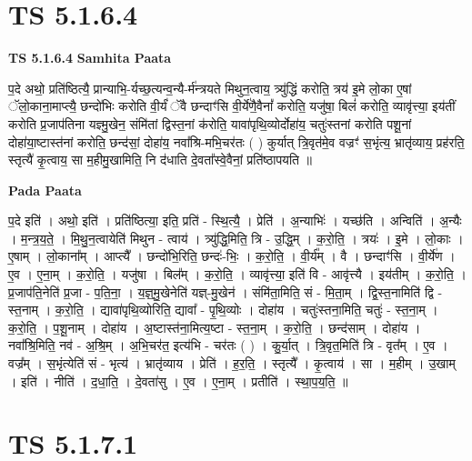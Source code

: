 \documentclass[17pt]{extarticle}
\begin{document}
\section*{ TS 5.1.6.4 }

\textbf{TS 5.1.6.4 } \newline
\textbf{Samhita Paata} \newline

प॒दे अथो॒ प्रति॑ष्ठित्यै॒ प्रान्याभि॒-र्यच्छ॒त्यन्व॒न्यै-र्म॑न्त्रयते मिथुन॒त्वाय॒ त्र्यु॑द्धिं करोति॒ त्रय॑ इ॒मे लो॒का ए॒षां ॅलो॒काना॒माप्त्यै॒ छन्दो॑भिः करोति वी॒र्यं॑ ॅवै छन्दाꣳ॑सि वी॒र्ये॑णै॒वैनां᳚ करोति॒ यजु॑षा॒ बिलं॑ करोति॒ व्यावृ॑त्त्या॒ इय॑तीं करोति प्र॒जाप॑तिना यज्ञ्मु॒खेन॒ संमि॑तां द्विस्त॒नां क॑रोति॒ यावा॑पृथि॒व्योर्दोहा॑य॒ चतुः॑स्तनां करोति पशू॒नां दोहा॑या॒ष्टास्त॑नां करोति॒ छन्द॑सां॒ दोहा॑य॒ नवा᳚श्रि-मभि॒चर॑तः ( ) कुर्यात् त्रि॒वृत॑मे॒व वज्रꣳ॑ स॒भृंत्य॒ भ्रातृ॑व्याय॒ प्रह॑रति॒ स्तृत्यै॑ कृ॒त्वाय॒ सा म॒हीमु॒खामिति॒ नि द॑धाति दे॒वता᳚स्वे॒वैनां॒ प्रति॑ष्ठापयति ॥ \newline

\textbf{Pada Paata} \newline

प॒दे इति॑ । अथो॒ इति॑ । प्रति॑ष्ठित्या॒ इति॒ प्रति॑ - स्थि॒त्यै॒ । प्रेति॑ । अ॒न्याभिः॑ । यच्छ॑ति । अन्विति॑ । अ॒न्यैः । म॒न्त्र॒य॒ते॒ । मि॒थु॒न॒त्वायेति॑ मिथुन - त्वाय॑ । त्र्यु॑द्धि॒मिति॒ त्रि - उ॒द्धि॒म् । क॒रो॒ति॒ । त्रयः॑ । इ॒मे । लो॒काः । ए॒षाम् । लो॒काना᳚म् । आप्त्यै᳚ । छन्दो॑भि॒रिति॒ छन्दः॑-भिः॒ । क॒रो॒ति॒ । वी॒र्य᳚म् । वै । छन्दाꣳ॑सि । वी॒र्ये॑ण । ए॒व । ए॒ना॒म् । क॒रो॒ति॒ । यजु॑षा । बिल᳚म् । क॒रो॒ति॒ । व्यावृ॑त्त्या॒ इति॑ वि - आवृ॑त्त्यै । इय॑तीम् । क॒रो॒ति॒ । प्र॒जाप॑ति॒नेति॑ प्र॒जा - प॒ति॒ना॒ । य॒ज्ञ्॒मु॒खेनेति॑ यज्ञ्-मु॒खेन॑ । संमि॑ता॒मिति॒ सं - मि॒ता॒म् । द्वि॒स्त॒नामिति॑ द्वि - स्त॒नाम् । क॒रो॒ति॒ । द्यावा॑पृथि॒व्योरिति॒ द्यावा᳚ - पृ॒थि॒व्योः । दोहा॑य । चतुः॑स्तना॒मिति॒ चतुः॑ - स्त॒ना॒म् । क॒रो॒ति॒ । प॒शू॒नाम् । दोहा॑य । अ॒ष्टास्त॑ना॒मित्य॒ष्टा - स्त॒ना॒म् । क॒रो॒ति॒ । छन्द॑साम् । दोहा॑य । नवा᳚श्रि॒मिति॒ नव॑ - अ॒श्रि॒म् । अ॒भि॒चर॑त॒ इत्य॑भि - चर॑तः ( ) । कु॒र्या॒त् । त्रि॒वृत॒मिति॑ त्रि - वृत᳚म् । ए॒व । वज्र᳚म् । स॒भृंत्येति॑ सं - भृत्य॑ । भ्रातृ॑व्याय । प्रेति॑ । ह॒र॒ति॒ । स्तृत्यै᳚ । कृ॒त्वाय॑ । सा । म॒हीम् । उ॒खाम् । इति॑ । नीति॑ । द॒धा॒ति॒ । दे॒वता॑सु । ए॒व । ए॒ना॒म् । प्रतीति॑ । स्था॒प॒य॒ति॒ ॥  \newline




\section*{ TS 5.1.7.1 }
\end{document}

